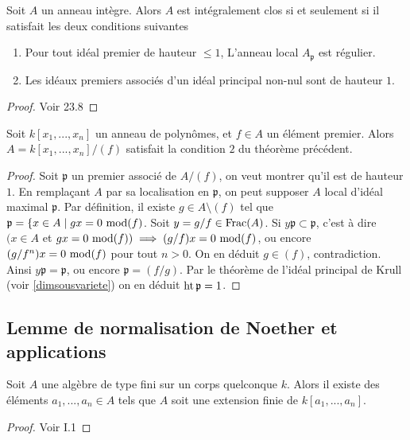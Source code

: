 \begin{thm}\label{SerreCritere}
Soit $A$ un anneau intègre. Alors $A$ est intégralement clos si et seulement si il satisfait les deux conditions suivantes
\begin{enumerate}
\item Pour tout idéal premier de hauteur $\leq 1$, L'anneau local $A_\mathfrak{p}$ est régulier.
\item Les idéaux premiers associés d'un idéal principal non-nul sont de hauteur $1$.
\end{enumerate}
\end{thm}
\begin{proof}
Voir \cite{Matsumura} 23.8
\end{proof}

\begin{prop}\label{SerreCritere2}
Soit $k[x_1,...,x_n]$ un anneau de polynômes, et $f\in A$ un élément premier. Alors $A=k[x_1,...,x_n]/(f)$ satisfait la condition $2$ du théorème précédent. 
\end{prop}
\begin{proof}
Soit $\mathfrak{p}$ un premier associé de $A/(f)$, on veut montrer qu'il est de hauteur $1$. En remplaçant $A$ par sa localisation en $\mathfrak{p}$, on peut supposer $A$ local d'idéal maximal $\mathfrak{p}$. Par définition, il existe $g\in A\setminus (f) $ tel que $\mathfrak{p}=\lbrace x\in A\mid gx=0 \,\operatorname{mod} (f)$. Soit $y=g/f\in \operatorname{Frac}(A)$. Si $y\mathfrak{p}\subset\mathfrak{p}$, c'est à dire $(x\in A$ et $gx=0 \,\operatorname{mod} (f))\implies (g/f)x=0\,\operatorname{mod} (f)$, ou encore $(g/f^n)x=0\,\operatorname{mod} (f)$ pour tout $n>0$. On en déduit $g\in (f)$, contradiction. Ainsi $y\mathfrak{p}=\mathfrak{p}$, ou encore $\mathfrak{p}=(f/g)$. Par le théorème de l'idéal principal de Krull (voir \ref{dimsousvariete}) on en déduit $\operatorname{ht} \mathfrak{p}=1$.
\end{proof}

\subsection{Lemme de normalisation de Noether et applications}

\begin{thm}\label{NoetherNormalisation}
Soit $A$ une algèbre de type fini sur un corps quelconque $k$. Alors il existe des éléments $a_1,...,a_n\in A$ tels que $A$ soit une extension finie de $k[a_1,...,a_n]$.
\end{thm}
\begin{proof}
Voir \cite{MumfordRedBook} I.1
\end{proof}

